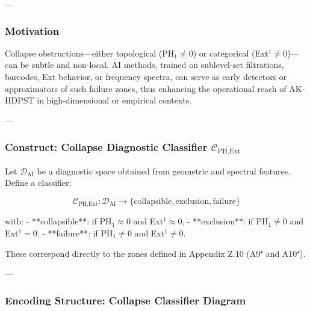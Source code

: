 \documentclass[11pt]{article}
\begin{document}
\begin{axiom}
\begin{axiom}
{{---

\subsubsection*{Motivation}

Collapse obstructions—either topological (PH$_1 \neq 0$) or categorical (Ext$^1 \neq 0$)—can be subtle and non-local.  
AI methods, trained on sublevel-set filtrations, barcodes, Ext behavior, or frequency spectra,  
can serve as early detectors or approximators of such failure zones,  
thus enhancing the operational reach of AK-HDPST in high-dimensional or empirical contexts.

---

\subsubsection*{Construct: Collapse Diagnostic Classifier \(\mathcal{C}_{\text{PH,Ext}}\)}

Let \( \mathcal{D}_{\text{AI}} \) be a diagnostic space obtained from geometric and spectral features.  
Define a classifier:

\[
\mathcal{C}_{\text{PH,Ext}} : \mathcal{D}_{\text{AI}} \to \{ \text{collapsible}, \text{exclusion}, \text{failure} \}
\]

with:
- **collapsible**: if PH$_1 \approx 0$ and Ext$^1 \approx 0$,
- **exclusion**: if PH$_1 \neq 0$ and Ext$^1 = 0$,
- **failure**: if PH$_1 \neq 0$ and Ext$^1 \neq 0$.

These correspond directly to the zones defined in Appendix Z.10 (A9⁺ and A10⁺).

---

\subsubsection*{Encoding Structure: Collapse Classifier Diagram}

\begin{center}
\end{center}

}}
\end{axiom}
\end{axiom}
\end{document}
